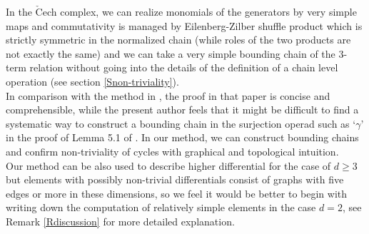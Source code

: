 \documentclass[reqno]{amsart}
\theoremstyle{definition}
\theoremstyle{plain}
\newcommand{\CECHC}{\check{\mathrm{C}}}
\begin{document}
In the $\CECHC$ech complex, we can realize monomials of the generators by very simple maps and commutativity is managed by Eilenberg-Zilber shuffle product which is strictly symmetric in the normalized chain (while  roles of the two products are not exactly the same) and we can take a very simple bounding chain of the 3-term relation without going into the details of the definition of a chain level operation  (see section \ref{Snon-triviality}). \\
\indent In comparison with the method in \cite{salvatore}, the proof in that paper is concise and  comprehensible, while the present author feels that it might be difficult to find a systematic way to construct  a bounding chain in the surjection operad such as `$\gamma$'  in the proof of Lemma 5.1 of \cite{salvatore}. In our method, we can construct  bounding chains and confirm non-triviality of cycles with graphical and topological intuition. \\
\indent Our method can be also used to describe higher differential for the case of $d\geq 3$ but elements with possibly non-trivial differentials   consist of graphs with five edges or more in these dimensions, so we feel it would be better to begin with writing down the computation of relatively simple elements in the case $d=2$, see Remark \ref{Rdiscussion} for more detailed explanation.\\
\end{document}
